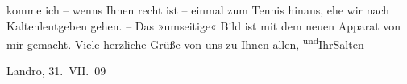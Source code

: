                komme ich – wenns Ihnen recht ist – einmal zum Tennis hinaus, ehe wir nach Kaltenleutgeben gehen. – Das »umseitige« Bild
               ist mit dem neuen Apparat von mir gemacht. Viele herzliche Grüße von uns zu Ihnen
                  allen, \substVorne{}\textsuperscript{und}\substDazwischen{}Ihr\substHinten{}{ }\spacefill\mbox{Salten}\pend
           
\pstart
           Landro, 31. VII. 09\pend
           \endnumbering{}  \newcommand{\dateiname}{L03505}\newcommand{\titel}{Felix Salten an Arthur Schnitzler, 31. 7. 1909}\newcommand{\editorInnen}{Martin Anton Müller und Laura Untner}
